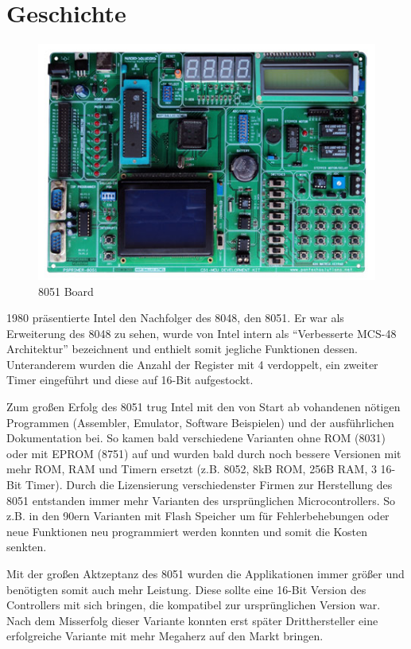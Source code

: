 
\chapter{Geschichte}\label{geschichte}

\begin{figure}[htbp]
\centering
\includegraphics{images/8051-board}
\caption[8051 Board ]{8051 Board \footnotemark{}}
\end{figure}

1980 präsentierte Intel den Nachfolger des 8048, den 8051. Er war als Erweiterung des 8048 zu sehen,
wurde von Intel intern als ``Verbesserte MCS-48 Architektur'' bezeichnent und enthielt somit
jegliche Funktionen dessen. Unteranderem wurden die Anzahl der Register mit 4 verdoppelt, ein
zweiter Timer eingeführt und diese auf 16-Bit aufgestockt.

Zum großen Erfolg des 8051 trug Intel mit den von Start ab vohandenen nötigen Programmen (Assembler,
Emulator, Software Beispielen) und der ausführlichen Dokumentation bei. So kamen bald verschiedene
Varianten ohne \ac{ROM} (8031) oder mit \ac{EPROM} (8751) auf und wurden bald durch noch bessere
Versionen mit mehr \ac{ROM}, \ac{RAM} und Timern ersetzt (z.B. 8052, 8kB \ac{ROM}, 256B \ac{RAM}, 3
16-Bit Timer). Durch die Lizensierung verschiedenster Firmen zur Herstellung des 8051 entstanden
immer mehr Varianten des ursprünglichen Microcontrollers. So z.B. in den 90ern Varianten mit Flash
Speicher um für Fehlerbehebungen oder neue Funktionen neu programmiert werden konnten und somit die
Kosten senkten.

Mit der großen Aktzeptanz des 8051 wurden die Applikationen immer größer und benötigten somit auch
mehr Leistung. Diese sollte eine 16-Bit Version des Controllers mit sich bringen, die kompatibel zur
ursprünglichen Version war. Nach dem Misserfolg dieser Variante konnten erst später Dritthersteller
eine erfolgreiche Variante mit mehr Megaherz auf den Markt bringen.